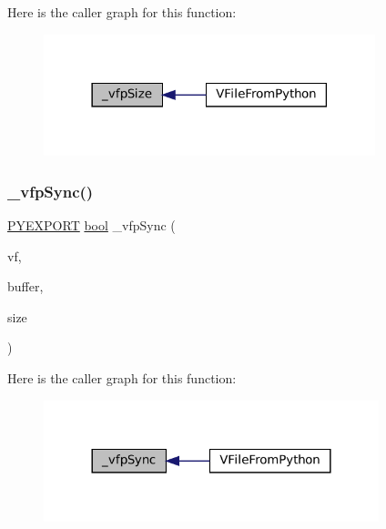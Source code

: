 Here is the caller graph for this function\+:
\nopagebreak
\begin{figure}[H]
\begin{center}
\leavevmode
\includegraphics[width=273pt]{vfs-py_8h_aaeb45e86edebf00351aa966cfd1709ec_icgraph}
\end{center}
\end{figure}
\mbox{\label{vfs-py_8h_a15e025946bb093e2da2701f6a805f8de}} 
\subsubsection{\texorpdfstring{\+\_\+vfp\+Sync()}{\_vfpSync()}}
{\footnotesize\ttfamily \mbox{\hyperlink{pycommon_8h_a68eebefd6b08dcf3f0bc2b2fe43a32b6}{P\+Y\+E\+X\+P\+O\+RT}} \mbox{\hyperlink{libretro_8h_a4a26dcae73fb7e1528214a068aca317e}{bool}} \+\_\+vfp\+Sync (\begin{DoxyParamCaption}\item[{struct V\+File $\ast$}]{vf,  }\item[{const void $\ast$}]{buffer,  }\item[{size\+\_\+t}]{size }\end{DoxyParamCaption})}

Here is the caller graph for this function\+:
\nopagebreak
\begin{figure}[H]
\begin{center}
\leavevmode
\includegraphics[width=276pt]{vfs-py_8h_a15e025946bb093e2da2701f6a805f8de_icgraph}
\end{center}
\end{figure}
\mbox{\label{vfs-py_8h_a5ac15c49208623a9cc85c268badc6347}} 
